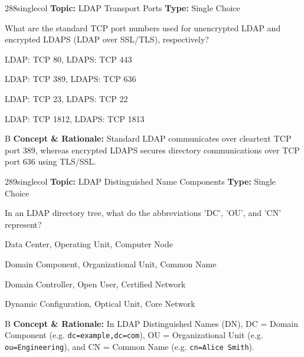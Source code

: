 \begin{qcard}{288}{singlecol}
\textcolor{darkslate!75}{\small\textbf{Topic:} LDAP Transport Ports \hfill \textbf{Type:} Single Choice}\vspace{0.4em}\par
What are the standard TCP port numbers used for unencrypted LDAP and encrypted LDAPS (LDAP over SSL/TLS), respectively?
\begin{qoptions}
\item LDAP: TCP 80, LDAPS: TCP 443
\item LDAP: TCP 389, LDAPS: TCP 636
\item LDAP: TCP 23, LDAPS: TCP 22
\item LDAP: TCP 1812, LDAPS: TCP 1813
\end{qoptions}
\end{qcard}
\nopagebreak
\begin{explainbox}{B}
\textbf{Concept \& Rationale:} Standard LDAP communicates over cleartext TCP port 389, whereas encrypted LDAPS secures directory communications over TCP port 636 using TLS/SSL.
\end{explainbox}

\begin{qcard}{289}{singlecol}
\textcolor{darkslate!75}{\small\textbf{Topic:} LDAP Distinguished Name Components \hfill \textbf{Type:} Single Choice}\vspace{0.4em}\par
In an LDAP directory tree, what do the abbreviations 'DC', 'OU', and 'CN' represent?
\begin{qoptions}
\item Data Center, Operating Unit, Computer Node
\item Domain Component, Organizational Unit, Common Name
\item Domain Controller, Open User, Certified Network
\item Dynamic Configuration, Optical Unit, Core Network
\end{qoptions}
\end{qcard}
\nopagebreak
\begin{explainbox}{B}
\textbf{Concept \& Rationale:} In LDAP Distinguished Names (DN), DC = Domain Component (e.g. \texttt{dc=example,dc=com}), OU = Organizational Unit (e.g. \texttt{ou=Engineering}), and CN = Common Name (e.g. \texttt{cn=Alice Smith}).
\end{explainbox}

